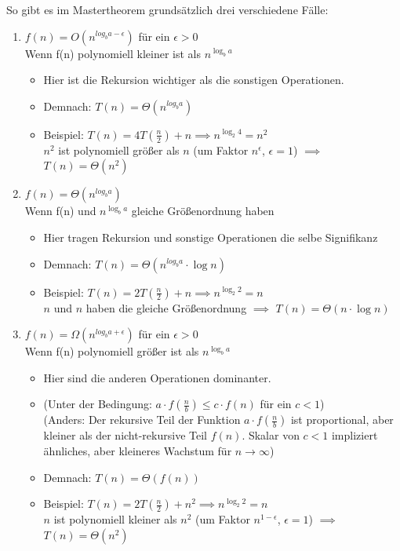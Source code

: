 \documentclass[
../AuD-Zusammenfassung.tex,
]
{subfiles}
\begin{document}
So gibt es im Mastertheorem grundsätzlich drei verschiedene Fälle:
\begin{enumerate}
    \item $f(n) = O(n^{log_b a-\epsilon})$ für ein $\epsilon > 0$\\
    Wenn f(n) polynomiell kleiner ist als $n^{\log_b a}$
    \begin{itemize}
        \item Hier ist die Rekursion wichtiger als die sonstigen Operationen. 
        \item Demnach: $T(n) = \Theta(n^{log_b a})$
        \item Beispiel: $T(n) = 4 T(\frac{n}{2}) + n \implies n^{\log_2 4} = n^2$\\
        $n^{2}$ ist polynomiell größer als $n$ (um Faktor $n^{\epsilon}$, $\epsilon = 1$) $\implies$ $T(n) = \Theta(n^2)$
    \end{itemize}
    \item $f(n) = \Theta(n^{log_b a})$\\
    Wenn f(n) und $n^{\log_b a}$ gleiche Größenordnung haben
    \begin{itemize}
        \item Hier tragen Rekursion und sonstige Operationen die selbe Signifikanz 
        \item Demnach: $T(n) = \Theta(n^{log_b a}\cdot \log n)$
        \item Beispiel: $T(n) = 2 T(\frac{n}{2}) + n \implies n^{\log_2 2} = n$\\
        $n$ und $n$ haben die gleiche Größenordnung $\implies$ $T(n) = \Theta(n \cdot \log n)$
    \end{itemize}
    \item $f(n) = \Omega(n^{log_b a+\epsilon})$ für ein $\epsilon > 0$\\
    Wenn f(n) polynomiell größer ist als $n^{\log_b a}$
    \begin{itemize}
        \item Hier sind die anderen Operationen dominanter.
        \item (Unter der Bedingung: $a\cdot f(\frac{n}{b})\leq c \cdot f(n)$ für ein $c < 1$)\\
        (Anders: Der rekursive Teil der Funktion $a\cdot f(\frac{n}{b})$ ist proportional, aber kleiner als der nicht-rekursive Teil $f(n)$. Skalar von $c<1$ impliziert ähnliches, aber kleineres Wachstum für $n \rightarrow \infty$)
        \item Demnach: $T(n) = \Theta(f(n))$
        \item Beispiel: $T(n) = 2 T(\frac{n}{2}) + n^2 \implies n^{\log_2 2} = n$\\
        $n$ ist polynomiell kleiner als $n^2$ (um Faktor $n^{1 - \epsilon}$, $\epsilon = 1$) $\implies$ $T(n) = \Theta(n^2)$
    \end{itemize}
\end{enumerate}
\end{document}
